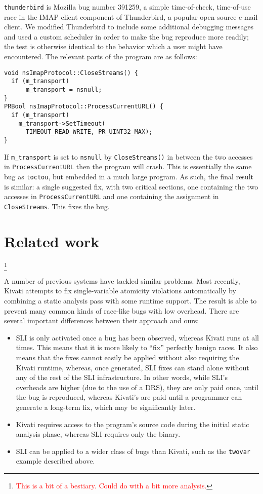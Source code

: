 \documentclass[10pt,twocolumn,preprint,natbib,authoryear]{sigplanconf}
\newcommand{\editorial}[1]{\textcolor{red}{\footnote{\textcolor{red}{#1}}}}
\begin{document}
\verb|thunderbird| is Mozilla bug number
391259\cite{thunderbird39125}, a simple time-of-check, time-of-use
race in the IMAP client component of Thunderbird, a popular
open-source e-mail client.  We modified Thunderbird to include some
additional debugging messages and used a custom scheduler in order to
make the bug reproduce more readily; the test is otherwise identical
to the behavior which a user might have encountered.  The relevant
parts of the program are as follows:

\begin{verbatim}
void nsImapProtocol::CloseStreams() {
  if (m_transport)
      m_transport = nsnull;
}
PRBool nsImapProtocol::ProcessCurrentURL() {
  if (m_transport)
    m_transport->SetTimeout(
      TIMEOUT_READ_WRITE, PR_UINT32_MAX);
}
\end{verbatim}

\noindent
If \verb|m_transport| is set to \verb|nsnull| by \verb|CloseStreams()|
in between the two accesses in \verb|ProcessCurrentURL| then the
program will crash.  This is essentially the same bug as
\verb|toctou|, but embedded in a much large program.  As such, the
final result is similar: a single suggested fix, with two critical
sections, one containing the two accesses in \verb|ProcessCurrentURL|
and one containing the assignment in \verb|CloseStreams|.  This fixes
the bug.

\section{Related work}\editorial{This is a bit of a bestiary.  Could do with a bit more analysis.}

A number of previous systems have tackled similar problems.  Most
recently, Kivati\cite{Chew2010a} attempts to fix single-variable
atomicity violations automatically by combining a static analysis pass
with some runtime support.  The result is able to prevent many common
kinds of race-like bugs with low overhead.  There are several
important differences between their approach and ours:

\begin{itemize}
\item SLI is only activated once a bug has been observed, whereas
  Kivati runs at all times.  This means that it is more likely to
  ``fix'' perfectly benign races.  It also means that the fixes cannot
  easily be applied without also requiring the Kivati runtime,
  whereas, once generated, SLI fixes can stand alone without any of
  the rest of the SLI infrastructure.  In other words, while SLI's
  overheads are higher (due to the use of a DRS), they are only paid
  once, until the bug is reproduced, whereas Kivati's are paid until a
  programmer can generate a long-term fix, which may be significantly
  later.
\item Kivati requires access to the program's source code during the
  initial static analysis phase, whereas SLI requires only the binary.
\item SLI can be applied to a wider class of bugs than Kivati, such as
  the \verb|twovar| example described above.
\end{itemize}
\end{document}
